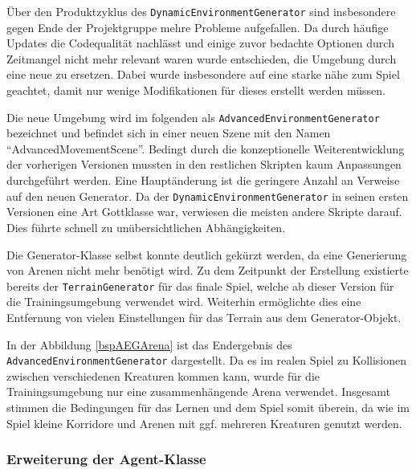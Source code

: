 Über den Produktzyklus des \texttt{DynamicEnvironmentGenerator} sind insbesondere gegen Ende der Projektgruppe mehre Probleme aufgefallen. Da durch häufige Updates die Codequalität nachlässt und einige zuvor bedachte Optionen durch Zeitmangel nicht mehr relevant waren wurde entschieden, die Umgebung durch eine neue zu ersetzen. Dabei wurde insbesondere auf eine starke nähe zum Spiel geachtet, damit nur wenige Modifikationen für dieses erstellt werden müssen.

Die neue Umgebung wird im folgenden als \texttt{AdvancedEnvironmentGenerator} bezeichnet und befindet sich in einer neuen Szene mit den Namen \enquote{AdvancedMovementScene}. Bedingt durch die konzeptionelle Weiterentwicklung der vorherigen Versionen mussten in den restlichen Skripten kaum Anpassungen durchgeführt werden. Eine Hauptänderung ist die geringere Anzahl an Verweise auf den neuen Generator. Da der \texttt{DynamicEnvironmentGenerator} in seinen ersten Versionen eine Art Gottklasse war, verwiesen die meisten andere Skripte darauf. Dies führte schnell zu unübersichtlichen Abhängigkeiten.

Die Generator-Klasse selbst konnte deutlich gekürzt werden, da eine Generierung von Arenen nicht mehr benötigt wird. Zu dem Zeitpunkt der Erstellung existierte bereits der \texttt{TerrainGenerator} für das finale Spiel, welche ab dieser Version für die Trainingsumgebung verwendet wird. Weiterhin ermöglichte dies eine Entfernung von vielen Einstellungen für das Terrain aus dem Generator-Objekt.

In der Abbildung \ref{bspAEGArena} ist das Endergebnis des \texttt{AdvancedEnvironmentGenerator} dargestellt. Da es im realen Spiel zu Kollisionen zwischen verschiedenen Kreaturen kommen kann, wurde für die Trainingsumgebung nur eine zusammenhängende Arena verwendet. Insgesamt stimmen die Bedingungen für das Lernen und dem Spiel somit überein, da wie im Spiel kleine Korridore und Arenen mit ggf. mehreren Kreaturen genutzt werden.
\subsubsection{Erweiterung der Agent-Klasse}

